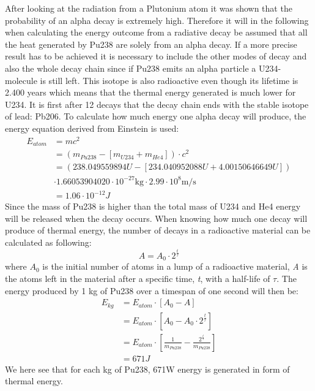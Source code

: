 \label{sec:HeatGeneration}
After looking at the radiation from a Plutonium atom it was shown that the probability of an alpha decay is extremely high. Therefore it will in the following when calculating the energy outcome from a radiative decay be assumed that all the heat generated by Pu238 are solely from an alpha decay. If a more precise result has to be achieved it is necessary to include the other modes of decay and also the whole decay chain since if Pu238 emits an alpha particle a U234-molecule is still left. This isotope is also radioactive even though its lifetime is 2.400 years which means that the thermal energy generated is much lower for U234. It is first after 12 decays that the decay chain ends with the stable isotope of lead: Pb206\cite{website:plutonium}. To calculate how much energy one alpha decay will produce, the energy equation derived from Einstein is used:
\begin{equation}
\begin{aligned} 
\text{$E_{atom}$} & ={} mc^2 \\
& = (m_{Pu238} - [m_{U234} + m_{He4}]) \cdot c^2 \\
& = (238.049559894U - [234.040952088U + 4.00150646649U])\\
& \cdot 1.66053904020\cdot 10^{-27}\text{kg} \cdot 2.99\cdot 10^8 \text{m/s}\\
& = 1.06\cdot 10^{-12} J 
\end{aligned}
\end{equation}
Since the mass of Pu238 is higher than the total mass of U234 and He4 energy will be released when the decay occurs. When knowing how much one decay will produce of thermal energy, the number of decays in a radioactive material can be calculated as following\cite{website:decay}:
\begin{equation}\label{eq:halflife}
A = A_0 \cdot 2^{\frac{t}{\tau}}
\end{equation}
where \textit{$A_0$} is the initial number of atoms in a lump of a radioactive material, \textit{A} is the atoms left in the material after a specific time, \textit{t}, with a half-life of  \textit{$\tau$}. The energy produced by 1 kg of Pu238 over a timespan of one second will then be: 
\begin{equation}
\begin{aligned} 
\text{$E_{kg}$} & ={} E_{atom} \cdot [A_0 - A] \\
& = E_{atom} \cdot \left[A_0 - A_0 \cdot 2^{\frac{t}{\tau}}\right] \\
& = E_{atom}  \cdot \left[\frac{1}{m_{Pu238}} - \frac{2^{\frac{t}{\tau}}}{m_{Pu238}} \right] \\
& = 671 J
\end{aligned}
\end{equation}
We here see that for each kg of Pu238, 671W energy is generated in form of thermal energy.  \\

